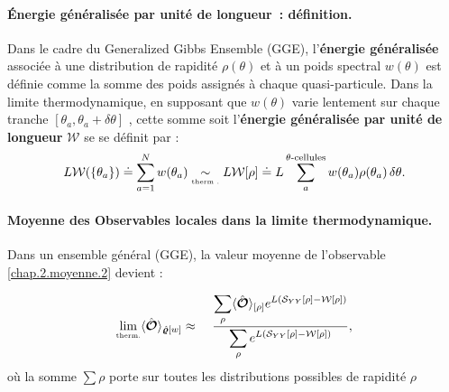

\paragraph{Énergie généralisée par unité de longueur : définition.}

Dans le cadre du Generalized Gibbs Ensemble (GGE), l’\textbf{énergie généralisée} associée à une distribution de rapidité $\rho(\theta)$ et à un poids spectral $w(\theta)$ est définie comme la somme des poids assignés à chaque quasi-particule. 
Dans la limite thermodynamique, en supposant que $w(\theta)$ varie lentement sur chaque tranche $[\theta_a, \theta_a + \delta\theta]$ ,  cette somme soit l’\textbf{énergie généralisée par unité de longueur} $\mathcal{W}$ se se définit par :
\begin{eqnarray}
	L \mathcal{W}(\{\theta_a\}) \doteq  \sum_{a = 1}^N w(\theta_a) 
	 \underset{\mbox{\tiny therm .}}{\sim}  L \mathcal{W}[\rho]  \doteq  L \sum_a^{\theta\text{-cellules}} w(\theta_a) \rho(\theta_a)\, \delta\theta. 
\end{eqnarray} 


\paragraph{Moyenne des Observables locales dans la limite thermodynamique.}

Dans un ensemble général (GGE), la valeur moyenne de l’observable \eqref{chap.2.moyenne.2} devient :	
	
\begin{eqnarray}\label{chap.2.moyenne.3}
	\underset{\mbox{\tiny therm.}}{\lim} \langle \hat{\bm{\mathcal{O}}} \rangle_{\hat{\bm{\varrho}}[w]} &  \approx &  ~ \frac{  \displaystyle \sum_{\rho }  \langle \hat{\bm{\mathcal{O}}}\rangle_{[\rho]}  e^{L(\mathcal{S}_{YY}[\rho] -  \mathcal{W}[\rho]) }}{ \displaystyle \sum_{\rho } e^{L(\mathcal{S}_{YY}[\rho] -  \mathcal{W}[\rho]) } },
\end{eqnarray}
où la somme $\sum\rho$ porte sur toutes les distributions possibles de rapidité $\rho$

